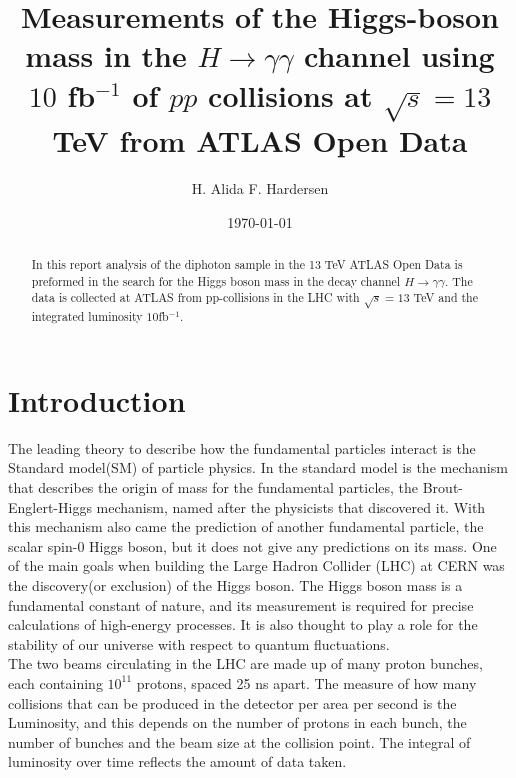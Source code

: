 \documentclass[10pt, aps, twocolumn, a4paper, nofootinbib]{revtex4}
\begin{document}
\title{Measurements of the Higgs-boson mass in the $H\rightarrow \gamma\gamma$ channel using $10$ fb$^{-1}$ of $pp$ collisions at $\sqrt{s} = 13$ TeV from ATLAS Open Data}
\author{H. Alida F. Hardersen}
\date{\today}

\begin{abstract}
    \centering 
    In this report analysis of the diphoton sample in the 13 TeV ATLAS Open Data is preformed in the search for the Higgs boson mass in the decay channel $H\rightarrow\gamma\gamma$. The data is collected at ATLAS from pp-collisions in the LHC with $\sqrt{s} = 13$ TeV and the integrated luminosity $10$fb$^{-1}$. 
\end{abstract}
\maketitle

\section{Introduction}

The leading theory to describe how the fundamental particles interact is the Standard model(SM) of particle physics. In the standard model is the mechanism that describes the origin of mass for the fundamental particles, the Brout-Englert-Higgs mechanism, named after the physicists that discovered it. With this mechanism also came the prediction of another fundamental particle, the scalar spin-0 Higgs boson, but it does not give any predictions on its mass. One of the main goals when building the Large Hadron Collider (LHC) at CERN was the discovery(or exclusion) of the Higgs boson. The Higgs boson mass is a fundamental constant of nature, and its measurement is required for precise calculations of high-energy processes. It is also thought to play a role for the stability of our universe with respect to quantum fluctuations.\\

The two beams circulating in the LHC are made up of many proton bunches, each containing $10^{11}$ protons, spaced 25 ns apart. The measure of how many collisions that can be produced in the detector per area per second is the Luminosity, and this depends on the number of protons in each bunch, the number of bunches and the beam size at the collision point. The integral of luminosity over time reflects the amount of data taken. \\
\end{document}
